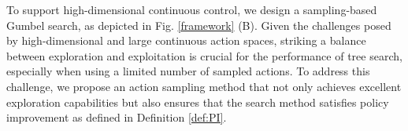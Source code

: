 


To support high-dimensional continuous control, we design a sampling-based Gumbel search, as depicted in Fig. \ref{framework} (B). Given the challenges posed by high-dimensional and large continuous action spaces, striking a balance between exploration and exploitation is crucial for the performance of tree search, especially when using a limited number of sampled actions. To address this challenge, we propose an action sampling method that not only achieves excellent exploration capabilities but also ensures that the search method satisfies policy improvement as defined in Definition \ref{def:PI}.


